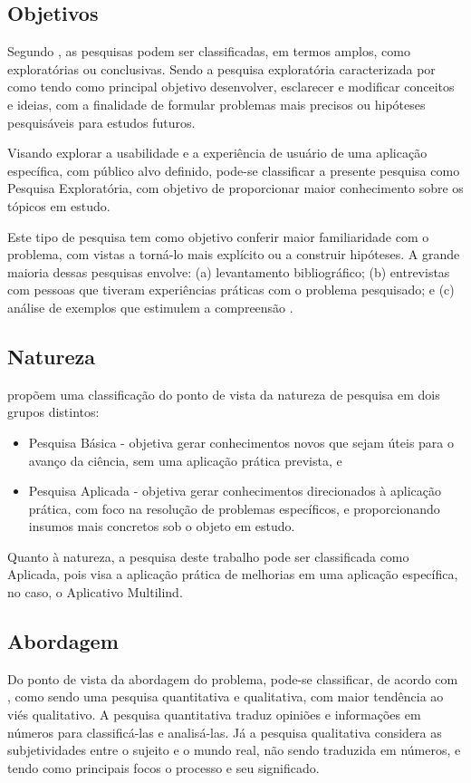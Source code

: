 \subsection{Objetivos}
\label{sec:Objetivos2}
Segundo , as pesquisas podem ser classificadas, em termos amplos, como exploratórias ou conclusivas. Sendo a pesquisa exploratória caracterizada por  como tendo como principal objetivo 
desenvolver, esclarecer e modificar conceitos e ideias, com a finalidade de formular problemas mais precisos ou hipóteses pesquisáveis para estudos futuros.

Visando explorar a usabilidade e a experiência de usuário de uma aplicação específica, com público alvo definido, pode-se classificar a presente pesquisa como Pesquisa Exploratória, com objetivo de proporcionar maior conhecimento 
sobre os tópicos em estudo.

Este tipo de pesquisa tem como objetivo conferir maior familiaridade com o problema, com vistas a torná-lo mais explícito ou a construir hipóteses. A grande maioria dessas pesquisas envolve: (a) levantamento 
bibliográfico; (b) 	entrevistas com pessoas que tiveram experiências práticas com o problema pesquisado; e (c) análise de exemplos que estimulem a compreensão \cite{gil2002}.

\subsection{Natureza}
\label{sec:Natureza}
 propõem uma classificação do ponto de vista da natureza de pesquisa em dois grupos distintos:

\begin{itemize}
	\item Pesquisa Básica - objetiva gerar conhecimentos novos que sejam úteis para o avanço da ciência, sem uma aplicação prática prevista, e
	\item Pesquisa Aplicada - objetiva gerar conhecimentos direcionados à aplicação prática, com foco na resolução de problemas específicos, e 
	proporcionando insumos mais concretos sob o objeto em estudo.
\end{itemize}

Quanto à natureza, a pesquisa deste trabalho pode ser classificada como Aplicada, pois visa a aplicação prática de melhorias em uma aplicação específica, no caso, o Aplicativo Multilind.

\subsection{Abordagem}
\label{sec:Abordagem}
Do ponto de vista da abordagem do problema, pode-se classificar, de acordo com , como sendo uma pesquisa quantitativa e qualitativa, com maior tendência ao viés qualitativo. A pesquisa quantitativa traduz opiniões e informações em 
números para classificá-las e analisá-las. Já a pesquisa qualitativa considera as subjetividades entre o sujeito e o mundo real, não sendo traduzida em números, e tendo como principais focos o processo e seu significado.

